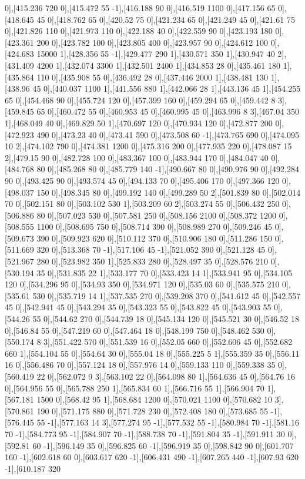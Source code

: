 {0],[415.236 720 0],[415.472 55 -1],[416.188 90 0],[416.519 1100 0],[417.156 65 0],[418.645 45 0],[418.762 65 0],[420.52 75 0],[421.234 65 0],[421.249 45 0],[421.61 75 0],[421.826 110 0],[421.973 110 0],[422.188 40 0],[422.559 90 0],[423.193 180 0],[423.361 200 0],[423.782 100 0],[423.805 400 0],[423.957 90 0],[424.612 100 0],[424.683 15000 1],[428.356 55 -1],[429.477 290 1],[430.571 350 1],[430.947 40 2],[431.409 4200 1],[432.074 3300 1],[432.501 2400 1],[434.853 28 0],[435.461 180 1],[435.864 110 0],[435.908 55 0],[436.492 28 0],[437.446 2000 1],[438.481 130 1],[438.96 45 0],[440.037 1100 1],[441.556 880 1],[442.066 28 1],[443.136 45 1],[454.255 65 0],[454.468 90 0],[455.724 120 0],[457.399 160 0],[459.294 65 0],[459.442 8 3],[459.845 65 0],[460.472 55 0],[460.953 45 0],[460.995 45 0],[463.996 8 3],[467.04 350 1],[468.049 40 0],[469.829 50 1],[470.697 120 0],[470.934 120 0],[472.877 200 0],[472.923 490 0],[473.23 40 0],[473.41 590 0],[473.508 60 -1],[473.765 690 0],[474.095 10 2],[474.102 790 0],[474.381 1200 0],[475.316 200 0],[477.935 220 0],[478.087 15 2],[479.15 90 0],[482.728 100 0],[483.367 100 0],[483.944 170 0],[484.047 40 0],[484.768 80 0],[485.268 80 0],[485.779 140 -1],[490.667 80 0],[490.976 90 0],[492.284 90 0],[493.425 90 0],[493.574 45 0],[494.133 70 0],[495.406 170 0],[497.366 120 0],[498.037 150 0],[498.345 80 0],[499.192 140 0],[499.289 50 2],[501.839 80 0],[502.014 70 0],[502.151 80 0],[503.102 530 1],[503.209 60 2],[503.274 55 0],[506.432 250 0],[506.886 80 0],[507.023 530 0],[507.581 250 0],[508.156 2100 0],[508.372 1200 0],[508.555 1100 0],[508.695 750 0],[508.714 390 0],[508.989 270 0],[509.246 45 0],[509.673 390 0],[509.923 620 0],[510.112 370 0],[510.906 180 0],[511.286 150 0],[511.669 320 0],[513.368 70 -1],[517.106 45 -1],[521.052 390 0],[521.128 45 0],[521.967 280 0],[523.982 350 1],[525.833 280 0],[528.497 35 0],[528.576 210 0],[530.194 35 0],[531.835 22 1],[533.177 70 0],[533.423 14 1],[533.941 95 0],[534.105 120 0],[534.296 95 0],[534.93 350 0],[534.971 120 0],[535.03 60 0],[535.575 210 0],[535.61 530 0],[535.719 14 1],[537.535 270 0],[539.208 370 0],[541.612 45 0],[542.557 45 0],[542.941 45 0],[543.294 35 0],[543.323 55 0],[543.822 45 0],[543.903 55 0],[544.26 55 0],[544.62 270 0],[544.739 18 0],[545.134 120 0],[545.521 30 0],[546.52 18 0],[546.84 55 0],[547.219 60 0],[547.464 18 0],[548.199 750 0],[548.462 530 0],[550.174 8 3],[551.422 570 0],[551.539 16 0],[552.05 660 0],[552.606 45 0],[552.682 660 1],[554.104 55 0],[554.64 30 0],[555.04 18 0],[555.225 5 1],[555.359 35 0],[556.11 16 0],[556.486 70 0],[557.124 18 0],[557.976 14 0],[559.133 110 0],[559.338 35 0],[560.419 22 0],[562.072 9 3],[563.102 22 0],[564.098 80 1],[564.636 45 0],[564.76 16 0],[564.956 55 0],[565.788 250 1],[565.834 60 1],[566.716 55 1],[566.904 70 1],[567.181 1500 0],[568.42 95 1],[568.684 1200 0],[570.021 1100 0],[570.682 10 3],[570.861 190 0],[571.175 880 0],[571.728 230 0],[572.408 180 0],[573.685 55 -1],[576.445 55 -1],[577.163 14 3],[577.274 95 -1],[577.532 55 -1],[580.984 70 -1],[581.16 70 -1],[584.773 95 -1],[584.907 70 -1],[588.738 70 -1],[591.804 35 -1],[591.911 30 0],[592.81 60 -1],[596.149 35 0],[596.825 60 -1],[596.919 35 0],[598.842 90 0],[601.707 160 -1],[602.618 60 0],[603.617 620 -1],[606.431 490 -1],[607.265 440 -1],[607.93 620 -1],[610.187 320 }
